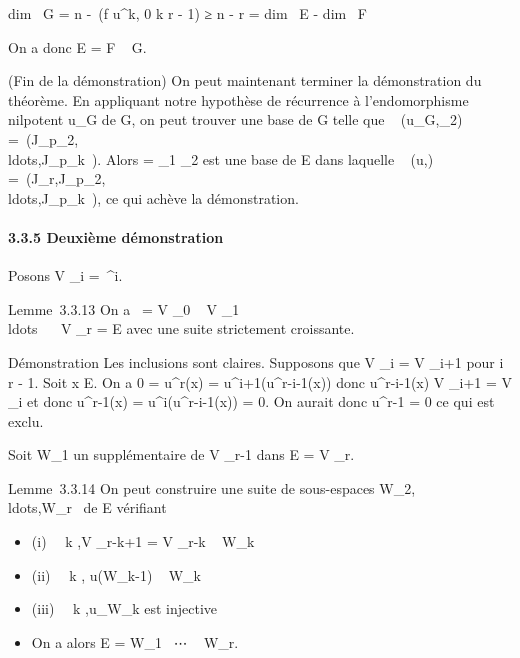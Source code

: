 \documentclass[]{article}
\begin{document}
dim~ G = n
-\mathrmrg~(f \cdot
u^k, 0 \leq k \leq r - 1) ≥ n - r = dim~ E
- dim~ F

On a donc E = F \oplus~ G.

(Fin de la démonstration) On peut maintenant terminer la démonstration
du théorème. En appliquant notre hypothèse de récurrence à
l'endomorphisme nilpotent u_G de G, on peut trouver
une base de G telle que
\mathrmMat~
(u_G,_2) =\
\mathrmdiag(J_p_2,\\ldots,J_p_k~).
Alors  = _1 \cup{}_2 est une base de E dans laquelle
\mathrmMat~ (u,\mathcal{E})
=\
\mathrmdiag(J_r,J_p_2,\\ldots,J_p_k~),
ce qui achève la démonstration.

\paragraph{3.3.5 Deuxième démonstration}

Posons V _i =\
\mathrmKeru^i.

Lemme~3.3.13 On a \0\ = V _0
\subset~ V _1
\subset~\\ldots~ \subset~ V
_r = E avec une suite strictement croissante.

Démonstration Les inclusions sont claires. Supposons que V _i =
V _i+1 pour i \leq r - 1. Soit x \in E. On a 0 = u^r(x) =
u^i+1(u^r-i-1(x)) donc u^r-i-1(x) \in V
_i+1 = V _i et donc u^r-1(x) =
u^i(u^r-i-1(x)) = 0. On aurait donc
u^r-1 = 0 ce qui est exclu.

Soit W_1 un supplémentaire de V _r-1 dans E = V
_r.

Lemme~3.3.14 On peut construire une suite de sous-espaces
W_2,\\ldots,W_r~
de E vérifiant

\begin{itemize}
\itemsep1pt\parskip0pt
\item
  (i) \forall~~k \in [1,r],\quad V
  _r-k+1 = V _r-k \oplus~ W_k
\item
  (ii) \forall~~k \in [2,r],\quad
  u(W_k-1) \subset~ W_k
\item
  (iii) \forall~~k \in [1,r -
  1],\quad u_W_k est
  injective
\item
  On a alors E = W_1 \oplus~⋯ \oplus~
  W_r.
\end{itemize}
\end{document}
